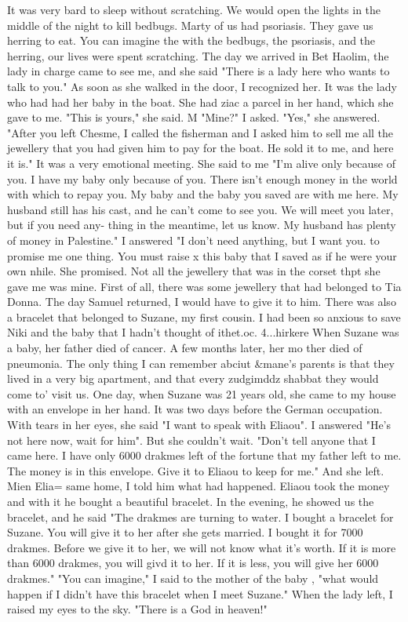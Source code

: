 It was very 
bard to sleep without scratching.
We would open the lights in the middle of the night to 
kill bedbugs.
Marty of us had psoriasis.
They gave us herring to eat.
You can imagine the 
with the bedbugs, the psoriasis, and the herring, our lives were spent scratching.
The day we arrived in Bet Haolim, the lady in charge came to see me, and she said 
"There is a lady here who wants to talk to you." As soon as she walked in the door, I 
recognized her. It was the lady who had had her baby in the boat. She had ziac a parcel 
in her hand, which she gave to me. "This is yours," she said. M "Mine?" I asked. "Yes," 
she answered. "After you left Chesme, I called the fisherman and I asked him to sell me 
all the jewellery that you had given him to pay for the boat. He sold it to me, and 
here it is." It was a very emotional meeting. She said to me "I'm alive only because 
of you. I have my baby only because of you. There isn't enough money in the world with 
which to repay you. My baby and the baby you saved are with me here. My husband still 
has his cast, and he can't come to see you. We will meet you later, but if you need any-
thing in the meantime, let us know. My husband has plenty of money in Palestine." I 
answered "I don't need anything, but I want you. to promise me one thing. You must raise 
x this baby that I saved as if he were your own nhile. She promised. 
Not all the jewellery that was in the corset thpt she gave me was mine. First of all, 
there was some jewellery that had belonged to Tia Donna. The day Samuel returned, I 
would have to give it to him. There was also a bracelet that belonged to Suzane, my first 
cousin. I had been so anxious to save Niki and the baby that I hadn't thought of 
ithet.oc. 4...hirkere 
When Suzane was a baby, her father died of cancer. A few months later, her mo
ther died of pneumonia. The only thing I can remember abciut &mane's parents is that 
they lived in a very big apartment, and that every zudgimddz shabbat they would come to' 
visit us.
One day, when Suzane was 21 years old, she came to my house with an envelope 
in her hand.
It was two days before the German occupation.
With tears in her eyes, she 
said "I want to speak with Eliaou".
I answered "He's not here now, wait for him".
But she couldn't wait.
"Don't tell anyone that I came here.
I have only 6000 drakmes 
left of the fortune that my father left to me.
The money is in this envelope.
Give it 
to Eliaou to keep for me."
And she left.
Mien Elia= same home, I told him what had happened.
Eliaou took the money and 
with it he bought a beautiful bracelet.
In the evening, he showed us the bracelet, and 
he said "The drakmes are turning to water.
I bought a bracelet for Suzane.
You will 
give it to her after she gets married.
I bought it for 7000 drakmes.
Before we give 
it to her, we will not know what it's worth.
If it is more than 6000 drakmes, you will 
givd it to her.
If it is less, you will give her 6000 drakmes."
"You can imagine," I said to the mother of the baby , "what would happen if I 
didn't have this bracelet when I meet Suzane."
When the lady left, I raised my eyes 
to the sky.
"There is a God in heaven!"

